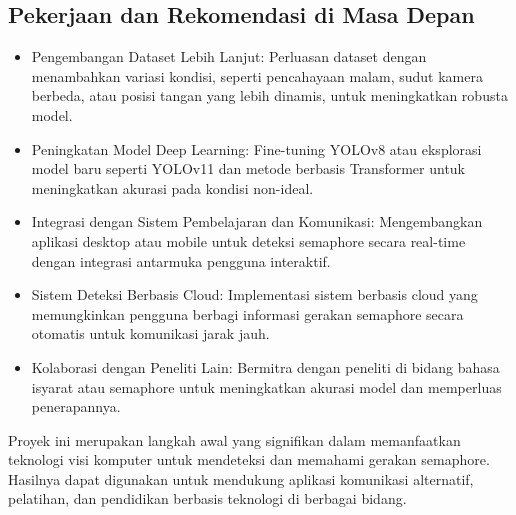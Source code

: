 \documentclass[12pt,a4paper]{article}
\begin{document}
\begin{adjustwidth}{3em}{0pt}
\subsection{Pekerjaan dan Rekomendasi di Masa Depan}
\begin{itemize}
    \item Pengembangan Dataset Lebih Lanjut: Perluasan dataset dengan menambahkan variasi kondisi, seperti pencahayaan malam, sudut kamera berbeda, atau posisi tangan yang lebih dinamis, untuk meningkatkan robusta model.
    \item Peningkatan Model Deep Learning: Fine-tuning YOLOv8 atau eksplorasi model baru seperti YOLOv11 dan metode berbasis Transformer untuk meningkatkan akurasi pada kondisi non-ideal.
    \item Integrasi dengan Sistem Pembelajaran dan Komunikasi: Mengembangkan aplikasi desktop atau mobile untuk deteksi semaphore secara real-time dengan integrasi antarmuka pengguna interaktif.
    \item Sistem Deteksi Berbasis Cloud: Implementasi sistem berbasis cloud yang memungkinkan pengguna berbagi informasi gerakan semaphore secara otomatis untuk komunikasi jarak jauh.
    \item Kolaborasi dengan Peneliti Lain: Bermitra dengan peneliti di bidang bahasa isyarat atau semaphore untuk meningkatkan akurasi model dan memperluas penerapannya.
\end{itemize}
\hspace{0.5cm} Proyek ini merupakan langkah awal yang signifikan dalam memanfaatkan teknologi visi komputer untuk mendeteksi dan memahami gerakan semaphore. Hasilnya dapat digunakan untuk mendukung aplikasi komunikasi alternatif, pelatihan, dan pendidikan berbasis teknologi di berbagai bidang.

\end{adjustwidth}
\newpage
\end{document}
